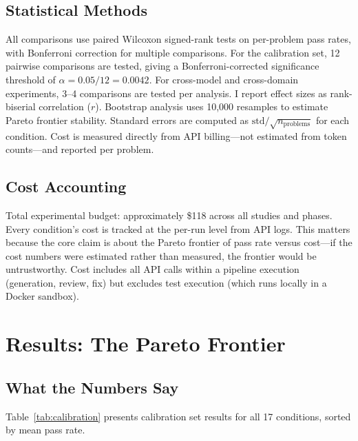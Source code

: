 \documentclass{article}
\begin{document}
\subsection{Statistical Methods}

All comparisons use paired Wilcoxon signed-rank tests on per-problem pass rates, with Bonferroni correction for multiple comparisons. For the calibration set, 12 pairwise comparisons are tested, giving a Bonferroni-corrected significance threshold of $\alpha=0.05/12=0.0042$. For cross-model and cross-domain experiments, 3--4 comparisons are tested per analysis. I report effect sizes as rank-biserial correlation ($r$). Bootstrap analysis uses 10,000 resamples to estimate Pareto frontier stability. Standard errors are computed as $\text{std}/\sqrt{n_{\text{problems}}}$ for each condition. Cost is measured directly from API billing---not estimated from token counts---and reported per problem.

\subsection{Cost Accounting}

Total experimental budget: approximately \$118 across all studies and phases. Every condition's cost is tracked at the per-run level from API logs. This matters because the core claim is about the Pareto frontier of pass rate versus cost---if the cost numbers were estimated rather than measured, the frontier would be untrustworthy. Cost includes all API calls within a pipeline execution (generation, review, fix) but excludes test execution (which runs locally in a Docker sandbox).

\section{Results: The Pareto Frontier}
\label{sec:results}

\subsection{What the Numbers Say}

Table~\ref{tab:calibration} presents calibration set results for all 17 conditions, sorted by mean pass rate.
\end{document}
